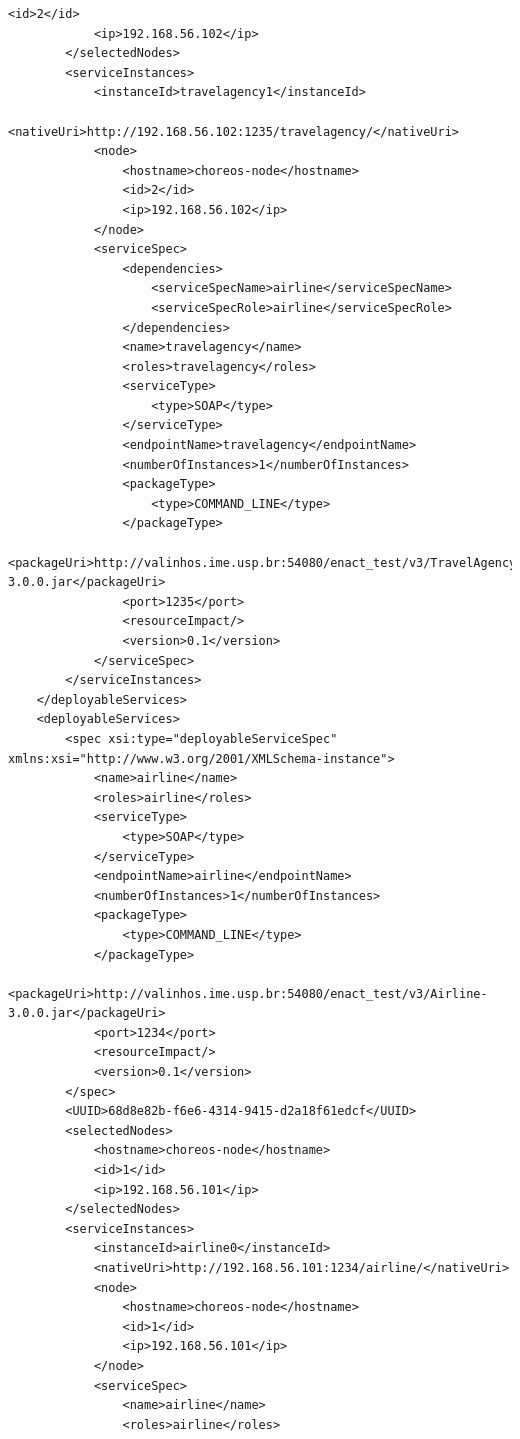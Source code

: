{\begin{lstlisting}[breaklines, caption=Choreography XML representation example., label=lst:chor_xml]
            <id>2</id>
            <ip>192.168.56.102</ip>
        </selectedNodes>
        <serviceInstances>
            <instanceId>travelagency1</instanceId>
            <nativeUri>http://192.168.56.102:1235/travelagency/</nativeUri>
            <node>
                <hostname>choreos-node</hostname>
                <id>2</id>
                <ip>192.168.56.102</ip>
            </node>
            <serviceSpec>
                <dependencies>
                    <serviceSpecName>airline</serviceSpecName>
                    <serviceSpecRole>airline</serviceSpecRole>
                </dependencies>
                <name>travelagency</name>
                <roles>travelagency</roles>
                <serviceType>
                    <type>SOAP</type>
                </serviceType>
                <endpointName>travelagency</endpointName>
                <numberOfInstances>1</numberOfInstances>
                <packageType>
                    <type>COMMAND_LINE</type>
                </packageType>
                <packageUri>http://valinhos.ime.usp.br:54080/enact_test/v3/TravelAgency-3.0.0.jar</packageUri>
                <port>1235</port>
                <resourceImpact/>
                <version>0.1</version>
            </serviceSpec>
        </serviceInstances>
    </deployableServices>
    <deployableServices>
        <spec xsi:type="deployableServiceSpec" xmlns:xsi="http://www.w3.org/2001/XMLSchema-instance">
            <name>airline</name>
            <roles>airline</roles>
            <serviceType>
                <type>SOAP</type>
            </serviceType>
            <endpointName>airline</endpointName>
            <numberOfInstances>1</numberOfInstances>
            <packageType>
                <type>COMMAND_LINE</type>
            </packageType>
            <packageUri>http://valinhos.ime.usp.br:54080/enact_test/v3/Airline-3.0.0.jar</packageUri>
            <port>1234</port>
            <resourceImpact/>
            <version>0.1</version>
        </spec>
        <UUID>68d8e82b-f6e6-4314-9415-d2a18f61edcf</UUID>
        <selectedNodes>
            <hostname>choreos-node</hostname>
            <id>1</id>
            <ip>192.168.56.101</ip>
        </selectedNodes>
        <serviceInstances>
            <instanceId>airline0</instanceId>
            <nativeUri>http://192.168.56.101:1234/airline/</nativeUri>
            <node>
                <hostname>choreos-node</hostname>
                <id>1</id>
                <ip>192.168.56.101</ip>
            </node>
            <serviceSpec>
                <name>airline</name>
                <roles>airline</roles>

\end{lstlisting}}

